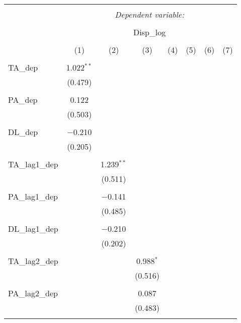 
\begin{table}[!htbp] \centering 
  \caption{} 
  \label{} 
\begin{tabular}{@{\extracolsep{5pt}}lccccccc} 
\\[-1.8ex]\hline 
\hline \\[-1.8ex] 
 & \multicolumn{7}{c}{\textit{Dependent variable:}} \\ 
\cline{2-8} 
\\[-1.8ex] & \multicolumn{7}{c}{Disp\_log} \\ 
\\[-1.8ex] & (1) & (2) & (3) & (4) & (5) & (6) & (7)\\ 
\hline \\[-1.8ex] 
 TA\_dep & 1.022$^{**}$ &  &  &  &  &  &  \\ 
  & (0.479) &  &  &  &  &  &  \\ 
  & & & & & & & \\ 
 PA\_dep & 0.122 &  &  &  &  &  &  \\ 
  & (0.503) &  &  &  &  &  &  \\ 
  & & & & & & & \\ 
 DL\_dep & $-$0.210 &  &  &  &  &  &  \\ 
  & (0.205) &  &  &  &  &  &  \\ 
  & & & & & & & \\ 
 TA\_lag1\_dep &  & 1.239$^{**}$ &  &  &  &  &  \\ 
  &  & (0.511) &  &  &  &  &  \\ 
  & & & & & & & \\ 
 PA\_lag1\_dep &  & $-$0.141 &  &  &  &  &  \\ 
  &  & (0.485) &  &  &  &  &  \\ 
  & & & & & & & \\ 
 DL\_lag1\_dep &  & $-$0.210 &  &  &  &  &  \\ 
  &  & (0.202) &  &  &  &  &  \\ 
  & & & & & & & \\ 
 TA\_lag2\_dep &  &  & 0.988$^{*}$ &  &  &  &  \\ 
  &  &  & (0.516) &  &  &  &  \\ 
  & & & & & & & \\ 
 PA\_lag2\_dep &  &  & 0.087 &  &  &  &  \\ 
  &  &  & (0.483) &  &  &  &  \\ 
  & & & & & & & \\ 

\end{tabular}
\end{table}
